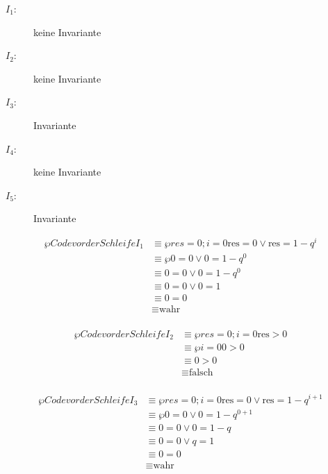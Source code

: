 \documentclass{bschlangaul-aufgabe}
\begin{document}
\begin{bAntwort}
\begin{description}
\item[$I_1$:] keine Invariante

\item[$I_2$:] keine Invariante

\item[$I_3$:] Invariante

\item[$I_4$:] keine Invariante

\item[$I_5$:] Invariante
\end{description}

%


\begin{align*}
\wp{Code vor der Schleife}{I_1}
& \equiv \wp{res = 0; i = 0}{\text{res} = 0 \lor \text{res} = 1 - q^i} \\
& \equiv \wp{}{0 = 0 \lor 0 = 1 - q^0} \\
& \equiv 0 = 0 \lor 0 = 1 - q^0 \\
& \equiv 0 = 0 \lor 0 = 1 \\
& \equiv 0 = 0 \\
& \equiv \text{wahr} \\
\end{align*}

\begin{align*}
\wp{Code vor der Schleife}{I_2}
& \equiv \wp{res = 0; i = 0}{\text{res} > 0} \\
& \equiv \wp{i = 0}{0 > 0} \\
& \equiv 0 > 0 \\
& \equiv \text{falsch} \\
\end{align*}

\begin{align*}
\wp{Code vor der Schleife}{I_3}
& \equiv \wp{res = 0; i = 0}{\text{res} = 0 \lor \text{res} = 1 - q^{i+1}} \\
& \equiv \wp{}{0 = 0 \lor 0 = 1 - q^{0+1}} \\
& \equiv 0 = 0 \lor 0 = 1 - q \\
& \equiv 0 = 0 \lor q = 1 \\
& \equiv 0 = 0 \\
& \equiv \text{wahr}\\
\end{align*}


\end{bAntwort}
\end{document}
